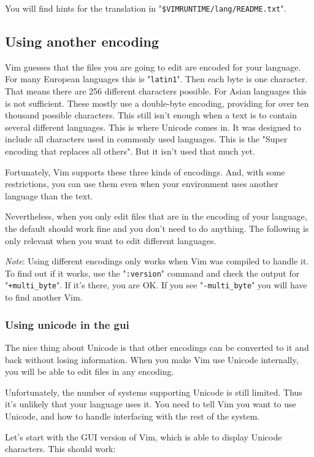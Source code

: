 You will find hints for the translation in "\verb!$VIMRUNTIME/lang/README.txt!".
\subsection{Using another encoding}
Vim guesses that the files you are going to edit are encoded for your language.
For many European languages this is "\verb!latin1!".
Then each byte is one character.
That means there are 256 different characters possible.
For Asian languages this is not sufficient.
These mostly use a double-byte encoding, providing for over ten thousand possible characters.
This still isn't enough when a text is to contain several different languages.
This is where Unicode comes in.
It was designed to include all characters used in commonly used languages.
This is the "Super encoding that replaces all others".
But it isn't used that much yet.

Fortunately, Vim supports these three kinds of encodings.
And, with some restrictions, you can use them even when your environment uses another language than the text.

Nevertheless, when you only edit files that are in the encoding of your language, the default should work fine and you don't need to do anything.
The following is only relevant when you want to edit different languages.

\emph{Note}:
Using different encodings only works when Vim was compiled to handle it.
To find out if it works, use the "\verb!:version!" command and check the output for "\verb!+multi_byte!".
If it's there, you are OK.
If you see "\verb!-multi_byte!" you will have to find another Vim.

\subsubsection{Using unicode in the gui}
The nice thing about Unicode is that other encodings can be converted to it and back without losing information.
When you make Vim use Unicode internally, you will be able to edit files in any encoding.

Unfortunately, the number of systems supporting Unicode is still limited.
Thus it's unlikely that your language uses it.
You need to tell Vim you want to use Unicode, and how to handle interfacing with the rest of the system.

Let's start with the GUI version of Vim, which is able to display Unicode characters.
This should work:

